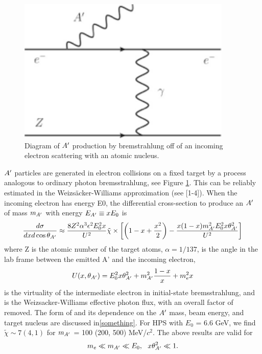 \begin{figure}
\includegraphics[scale=1]{measurements/Aprime-diagram.pdf}
\caption{Diagram of  $A^\prime$ production by bremstrahlung off of an incoming electron scattering with an atomic nucleus.}
\label{fig:apdiagram}
\end{figure}

$A^\prime$ particles are generated in electron collisions on a fixed target by a process analogous to ordinary photon bremsstrahlung, see Figure \ref{fig:apdiagram}.  This can be reliably estimated in the Weizsäcker-Williams approximation (see [1-4]).  When the incoming electron has energy E0, the differential cross-section to produce an $A^\prime$ of mass $m_{A^\prime}$ with energy $E_{A^\prime}\equiv x E_0$ is 
\begin{equation}
\frac{d\sigma}{dxd\cos{\theta_{A^\prime}}}\approx \frac{8Z^2\alpha^3\epsilon^2 E_0^2 x}{U^2}\tilde{\chi}\times\left[\left(1-x+\frac{x^2}{2}\right)-\frac{x(1-x)m_{A^\prime}^2E_0^2x\theta_{A^\prime}^2}{U^2}\right]
\end{equation}
where Z is the atomic number of the target atoms, $\alpha = 1/137$,  is the angle in the lab frame between the emitted A' and the incoming electron, 
\begin{equation}
U(x,\theta_{A^\prime})=E_0^2x\theta_{A^\prime}^2+m_{A^\prime}^2\frac{1-x}{x}+m_e^2x
\end{equation}
is the virtuality of the intermediate electron in initial-state bremsstrahlung, and  is the Weizsacker-Williams effective photon flux, with an overall factor of  removed.  The form of  and its dependence on the $A^\prime$ mass, beam energy, and target nucleus are discussed in\ref{something}.  For HPS with $E_0$ = 6.6 GeV, we find $\tilde{\chi}\sim 7 (4, 1)$ for $m_{A^\prime}$ = 100 (200, 500) MeV/$c^2$.
The above results are valid for 
\begin{equation}
m_e\ll m_{A^\prime}\ll E_0  , ~~ x\theta_{A^\prime}^2\ll 1.
\end{equation}


